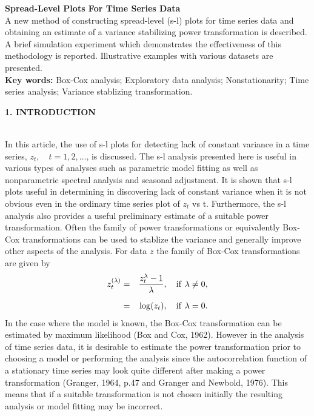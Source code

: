 \def\hind{\hangindent=2pc\hangafter=1}

\noindent
\bigskip
{\Large {\bf Spread-Level Plots For Time Series Data}}
\bigskip
\bigskip
\bigskip
\\A new method of constructing spread-level (s-l) plots for time series
data and obtaining an estimate of a variance stabilizing power 
transformation is described.
A brief simulation experiment which demonstrates the effectiveness of
this methodology is reported.
Illustrative examples with various datasets are presented.
\bigskip
\\{\bf Key words:}
Box-Cox analysis;
Exploratory data analysis;
Nonstationarity;
Time series analysis;
Variance stablizing transformation.
\bigskip
\centerline{\bf 1. INTRODUCTION}
\bigskip
\\In this article, the use of s-l plots for detecting lack of
constant variance in a time series, $z_t,\quad t=1,2,\ldots$, is
discussed. 
The s-l analysis presented here is useful in various types of analyses
such as parametric model fitting as well as nonparametric spectral
analysis and seasonal adjustment.
It is shown that s-l plots useful in determining in
discovering lack of constant variance when it is not obvious
even in the ordinary time series plot of $z_t$ vs t.
Furthermore, the s-l analysis also provides a useful preliminary
estimate of a suitable power transformation.
Often the family of power transformations or equivalently
Box-Cox transformations can be used to stablize the variance
and generally improve other aspects of the analysis.
For data $z$ the family of Box-Cox transformations are given
by
\begin{eqnarray}
\label{eqn:1}
z^{(\lambda)}_t &=& {z^{\lambda}_t -1\over{\lambda}},
\quad \rm{if }\  \lambda\ne 0,\\
\noalign{\vskip6pt}
			&=&\log(z_t), \quad \rm{if }\  \lambda=0. 
\end{eqnarray}
In the case where the model is known, the Box-Cox
transformation can be estimated by maximum likelihood (Box and Cox, 1962).
However in the analysis of time series data, it is desirable
to estimate the power transformation prior to choosing a model or
performing the analysis
since the autocorrelation function of a stationary time series
may look quite different after making a power transformation
(Granger, 1964, p.47 and Granger and Newbold, 1976).
This means that if a suitable transformation is not chosen
initially the resulting analysis or model fitting may be incorrect.
